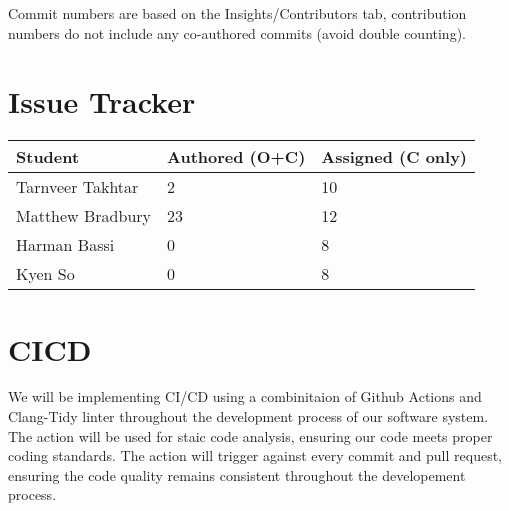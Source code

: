 \documentclass{article}
\begin{document}
Commit numbers are based on the Insights/Contributors tab, contribution numbers do not include any co-authored commits (avoid double counting).

\section{Issue Tracker}

\begin{table}[H]
\centering
\begin{tabular}{lll}
\toprule
\textbf{Student} & \textbf{Authored (O+C)} & \textbf{Assigned (C only)}\\
\midrule
Tarnveer Takhtar & 2 & 10\\
Matthew Bradbury & 23 & 12\\
Harman Bassi & 0 & 8\\
Kyen So & 0 & 8\\
\bottomrule
\end{tabular}
\end{table}

\section{CICD}

We will be implementing CI/CD using a combinitaion of Github Actions and Clang-Tidy linter throughout the development process of our software system. 
The action will be used for staic code analysis, ensuring our code meets proper coding standards. 
The action will trigger against every commit and pull request, ensuring the code quality remains consistent throughout the developement process.
\end{document}
